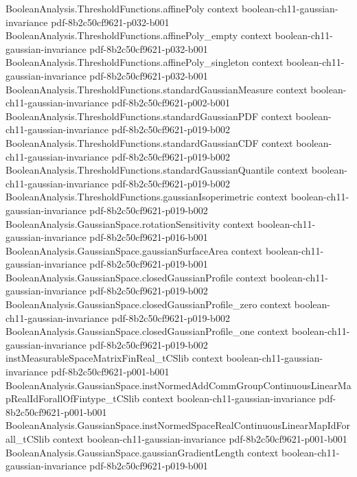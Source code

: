 \begin{theorem}
\proofstep
  {BooleanAnalysis.ThresholdFunctions.affinePoly}
  {context}
  {boolean-ch11-gaussian-invariance}
  {pdf-8b2c50cf9621-p032-b001}
\proofstep
  {BooleanAnalysis.ThresholdFunctions.affinePoly_empty}
  {context}
  {boolean-ch11-gaussian-invariance}
  {pdf-8b2c50cf9621-p032-b001}
\proofstep
  {BooleanAnalysis.ThresholdFunctions.affinePoly_singleton}
  {context}
  {boolean-ch11-gaussian-invariance}
  {pdf-8b2c50cf9621-p032-b001}
\proofstep
  {BooleanAnalysis.ThresholdFunctions.standardGaussianMeasure}
  {context}
  {boolean-ch11-gaussian-invariance}
  {pdf-8b2c50cf9621-p002-b001}
\proofstep
  {BooleanAnalysis.ThresholdFunctions.standardGaussianPDF}
  {context}
  {boolean-ch11-gaussian-invariance}
  {pdf-8b2c50cf9621-p019-b002}
\proofstep
  {BooleanAnalysis.ThresholdFunctions.standardGaussianCDF}
  {context}
  {boolean-ch11-gaussian-invariance}
  {pdf-8b2c50cf9621-p019-b002}
\proofstep
  {BooleanAnalysis.ThresholdFunctions.standardGaussianQuantile}
  {context}
  {boolean-ch11-gaussian-invariance}
  {pdf-8b2c50cf9621-p019-b002}
\proofstep
  {BooleanAnalysis.ThresholdFunctions.gaussianIsoperimetric}
  {context}
  {boolean-ch11-gaussian-invariance}
  {pdf-8b2c50cf9621-p019-b002}
\proofstep
  {BooleanAnalysis.GaussianSpace.rotationSensitivity}
  {context}
  {boolean-ch11-gaussian-invariance}
  {pdf-8b2c50cf9621-p016-b001}
\proofstep
  {BooleanAnalysis.GaussianSpace.gaussianSurfaceArea}
  {context}
  {boolean-ch11-gaussian-invariance}
  {pdf-8b2c50cf9621-p019-b001}
\proofstep
  {BooleanAnalysis.GaussianSpace.closedGaussianProfile}
  {context}
  {boolean-ch11-gaussian-invariance}
  {pdf-8b2c50cf9621-p019-b002}
\proofstep
  {BooleanAnalysis.GaussianSpace.closedGaussianProfile_zero}
  {context}
  {boolean-ch11-gaussian-invariance}
  {pdf-8b2c50cf9621-p019-b002}
\proofstep
  {BooleanAnalysis.GaussianSpace.closedGaussianProfile_one}
  {context}
  {boolean-ch11-gaussian-invariance}
  {pdf-8b2c50cf9621-p019-b002}
\proofstep
  {instMeasurableSpaceMatrixFinReal_tCSlib}
  {context}
  {boolean-ch11-gaussian-invariance}
  {pdf-8b2c50cf9621-p001-b001}
\proofstep
  {BooleanAnalysis.GaussianSpace.instNormedAddCommGroupContinuousLinearMapRealIdForallOfFintype_tCSlib}
  {context}
  {boolean-ch11-gaussian-invariance}
  {pdf-8b2c50cf9621-p001-b001}
\proofstep
  {BooleanAnalysis.GaussianSpace.instNormedSpaceRealContinuousLinearMapIdForall_tCSlib}
  {context}
  {boolean-ch11-gaussian-invariance}
  {pdf-8b2c50cf9621-p001-b001}
\proofstep
  {BooleanAnalysis.GaussianSpace.gaussianGradientLength}
  {context}
  {boolean-ch11-gaussian-invariance}
  {pdf-8b2c50cf9621-p019-b001}
\proofstep

\end{theorem}
